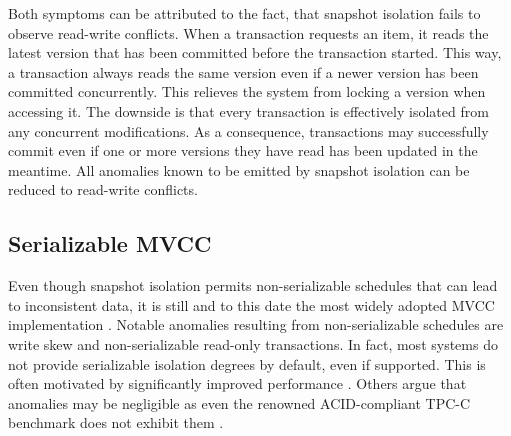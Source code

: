Both symptoms can be attributed to the fact, that snapshot isolation fails to
observe read-write conflicts. When a transaction requests an item, it reads the
latest version that has been committed before the transaction started. This way,
a transaction always reads the same version even if a newer version has been
committed concurrently. This relieves the system from locking a version when
accessing it. The downside is that every transaction is effectively isolated
from any concurrent modifications. As a consequence, transactions may
successfully commit even if one or more versions they have read has been updated
in the meantime. All anomalies known to be emitted by snapshot isolation can be
reduced to read-write conflicts.

\subsection{Serializable MVCC}

Even though snapshot isolation permits non-serializable schedules that can lead
to inconsistent data, it is still and to this date the most widely adopted MVCC
implementation \cite{cahill2009serializable, larson2011high, sikka2012efficient,
neumann2015fast}. Notable anomalies resulting from non-serializable schedules
are write skew and non-serializable read-only transactions. In fact, most
systems do not provide serializable isolation degrees by default, even if
supported. This is often motivated by significantly improved performance
\cite{cahill2009serializable}. Others argue that anomalies may be negligible as
even the renowned ACID-compliant TPC-C benchmark does not exhibit them
\cite{fekete2005making}.


